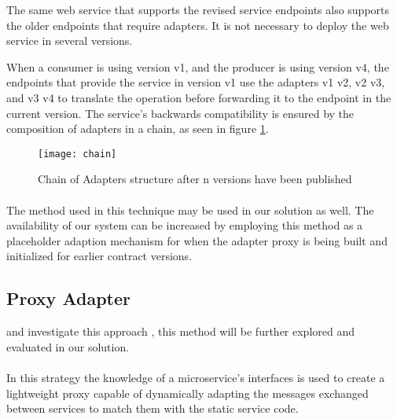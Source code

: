 The same web service that supports the revised service endpoints also supports the older endpoints that require adapters.
It is not necessary to deploy the web service in several versions.

When a consumer is using version v1, and the producer is using version v4, the endpoints that provide the service
in version v1 use the adapters v1 \textrightarrow v2, v2 \textrightarrow v3, and v3 \textrightarrow v4 to translate the operation before forwarding it to the endpoint in the current version.
The service's backwards compatibility is ensured by the composition of adapters in a chain, as seen in figure \ref{fig:chain}.

\begin{figure}[htbp]
    \centering
    \texttt{[image: chain]}
    \caption{Chain of Adapters structure
    after n versions have been published }
    \label{fig:chain}
\end{figure}

\paragraph{}

The method used in this technique may be used in our solution as well.
The availability of our system can be increased by employing this method as a
placeholder adaption mechanism for when the adapter proxy is being built and initialized for earlier contract versions.

\subsection{Proxy Adapter} %
\label{sec:proxy_adapter}

\citeauthor{seco2020robust} and \citeauthor{santosregent} investigate this approach \cite{seco2020robust, santosregent},
this method will be further explored and evaluated in our solution.

\paragraph{}

In this strategy the knowledge of a microservice’s
interfaces is used to create a lightweight proxy capable of dynamically adapting the messages exchanged between services to match them with the static service code.

\paragraph{}


